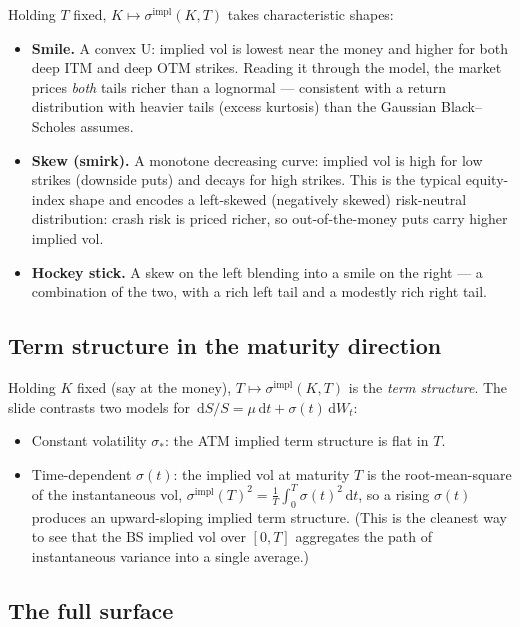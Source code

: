 \documentclass[11pt]{article}
\newcommand{\dd}{\,\mathrm{d}}
\newcommand{\impl}{\mathrm{impl}}
\begin{document}
Holding $T$ fixed, $K\mapsto\sigma^{\impl}(K,T)$ takes characteristic shapes:
\begin{itemize}[nosep]
\item \textbf{Smile.} A convex U: implied vol is lowest near the money and higher for both deep
      ITM and deep OTM strikes. Reading it through the model, the market prices \emph{both} tails
      richer than a lognormal --- consistent with a return distribution with heavier tails
      (excess kurtosis) than the Gaussian Black--Scholes assumes.
\item \textbf{Skew (smirk).} A monotone decreasing curve: implied vol is high for low strikes
      (downside puts) and decays for high strikes. This is the typical equity-index shape and
      encodes a left-skewed (negatively skewed) risk-neutral distribution: crash risk is priced
      richer, so out-of-the-money puts carry higher implied vol.
\item \textbf{Hockey stick.} A skew on the left blending into a smile on the right --- a
      combination of the two, with a rich left tail and a modestly rich right tail.
\end{itemize}

\subsection{Term structure in the maturity direction}

Holding $K$ fixed (say at the money), $T\mapsto\sigma^{\impl}(K,T)$ is the \emph{term structure}.
The slide contrasts two models for $\dd S/S=\mu\dd t+\sigma(t)\dd W_t$:
\begin{itemize}[nosep]
\item Constant volatility $\sigma_*$: the ATM implied term structure is flat in $T$.
\item Time-dependent $\sigma(t)$: the implied vol at maturity $T$ is the root-mean-square of the
      instantaneous vol, $\sigma^{\impl}(T)^2=\tfrac1T\int_0^T\sigma(t)^2\dd t$, so a rising
      $\sigma(t)$ produces an upward-sloping implied term structure. (This is the cleanest way to
      see that the BS implied vol over $[0,T]$ aggregates the path of instantaneous variance into
      a single average.)
\end{itemize}

\subsection{The full surface}
\end{document}
